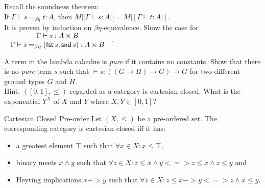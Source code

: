 \begin{exercise}
    Recall the soundness theorem:\\
    If $\Gamma \vdash s =_{\beta\eta} t : A$, then $M |[ \Gamma \vdash s: A |] = M |[ \Gamma \vdash t: A |]$.\\
    It is proven by induction on $\beta\eta$-equivalence.
    Show the case for $\inference{\Gamma \vdash s: A \times B}{\Gamma \vdash s =_{\beta\eta} (\mathsf{fst}\,s, \mathsf{snd}\,s): A \times B}$.
\end{exercise}

\begin{exercise}
    \label{ex:pure-peirce}
    A term in the lambda calculus is \textit{pure} if it contains no constants.
    Show that there is no \textit{pure} term $s$ such that $ \vdash s: ((G \to H) \to G) \to G$ for two different ground types $G$ and $H$.\\
    Hint: $([0, 1], \le)$ regarded as a category is cartesian closed.
    What is the exponential $Y^X$ of $X$ and $Y$ where $X, Y \in [0, 1]$?
\end{exercise}

\begin{definition}{Cartesian Closed Pre-order}
    Let $(X, \le)$ be a pre-ordered set.
    The corresponding category is cartesian closed iff it has:
    \begin{itemize}
        \item a greatest element $\top$ such that $\forall x \in X: x \le \top$,
        \item binary meets $x \land y$ such that $\forall z \in X: z \le x \land y <=> z \le x \land z \le y$ and
        \item Heyting implications $x -> y$ such that $\forall z \in X: z \le x -> y <=> z \land x \le y$.
    \end{itemize}
\end{definition}

